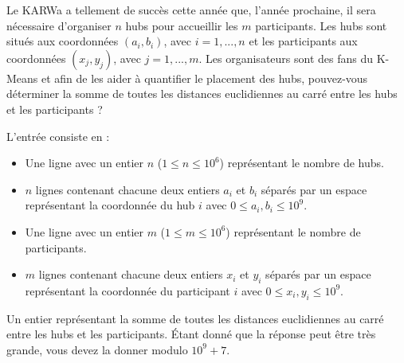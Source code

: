 \problemname{\problemyamlname}


\newcommand{\maxa}{123456789}

Le KARWa a tellement de succès cette année que, l'année prochaine, il sera nécessaire d'organiser $n$ hubs pour
accueillir les $m$ participants. Les hubs sont situés aux coordonnées $(a_i , b_i )$, avec $i = 1, ..., n$ et les participants aux coordonnées $(x_j , y_j )$, avec $j = 1, ..., m$.
Les organisateurs sont des fans du K-Means et afin de les aider à quantifier le placement des hubs, pouvez-vous
déterminer la somme de toutes les distances euclidiennes au carré entre les hubs et les participants ?
\begin{Input}
    L'entrée consiste en :
    \begin{itemize}
        \item Une ligne avec un entier \(n\) (\(1 \leq n \leq 10^{6}\)) représentant le nombre de hubs.
      \item \(n\) lignes contenant chacune deux entiers \(a_{i}\) et \(b_{i}\) séparés par un espace représentant la coordonnée du hub \(i\) avec \(0 \leq a_i, b_i\leq 10^{9}\).
        \item Une ligne avec un entier \(m\) (\(1 \leq m \leq 10^{6}\))  représentant le nombre de participants.
      \item \(m\) lignes contenant chacune deux entiers \(x_{i}\) et \(y_{i}\) séparés par un espace représentant la coordonnée du participant \(i\) avec \(0 \leq x_i, y_i\leq 10^{9}\).
    \end{itemize}
\end{Input}

\begin{Output}
Un entier représentant la somme de toutes les distances euclidiennes au carré entre les hubs et les participants. Étant donné que la réponse peut être très grande, vous devez la donner modulo \(10^9 + 7\).
\end{Output}
